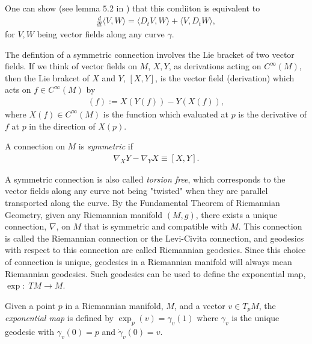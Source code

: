 One can show (see lemma $5.2$ in \cite{lee2006riemannian}) that this condiiton is equivalent to
\begin{align*}
\frac{d}{dt} \langle V, W \rangle = \langle D_t V, W \rangle + \langle V, D_t W \rangle,
\end{align*}
for $V, W$ being vector fields along any curve $\gamma$.

The defintion of a symmetric connection involves the Lie bracket of two vector fields. If we think of vector fields on $M$, $X, Y$, as derivations acting on $C^\infty (M)$, then the Lie brakcet of $X$ and $Y$, $[X , Y]$, is the vector field (derivation) which acts on $f \in C^\infty (M)$ by
\begin{align*}
[X , Y] (f) := X(Y(f)) - Y(X(f)),
\end{align*}
where $X(f) \in C^\infty (M)$ is the function which evaluated at $p$ is the derivative of $f$ at $p$ in the direction of $X(p)$.

\begin{definition}
A connection on $M$ is \textit{symmetric} if
\begin{align*}
\nabla_X Y - \nabla_Y X \equiv [X, Y].
\end{align*}
\end{definition}

A symmetric connection is also called \textit{torsion free}, which corresponds to the vector fields along any curve not being "twisted" when they are parallel transported along the curve. By the Fundamental Theorem of Riemannian Geometry, given any Riemannian manifold $(M,g)$, there exists a unique connection, $\nabla$, on $M$ that is symmetric and compatible with $M$. This connection is called the Riemannian connection or the Levi-Civita connection, and geodesics with respect to this connection are called Riemannian geodesics. Since this choice of connection is unique, geodesics in a Riemannian manifold will always mean Riemannian geodesics. Such geodesics can be used to define the exponential map, $\exp: \; TM \rightarrow M$.

\begin{definition}
Given a point $p$ in a Riemannian manifold, $M$, and a vector $v \in T_p M$, the \textit{exponential map} is defined by $\exp_p (v) = \gamma_v(1)$ where $\gamma_v$ is the unique geodesic with $\gamma_v(0) = p$ and $\dot{\gamma}_v(0) = v$.
\end{definition}

